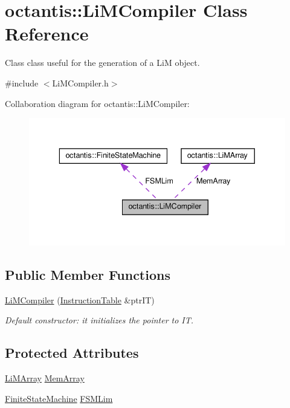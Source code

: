 \hypertarget{classoctantis_1_1LiMCompiler}{}\section{octantis\+:\+:Li\+M\+Compiler Class Reference}
\label{classoctantis_1_1LiMCompiler}


Class class useful for the generation of a LiM object.  




{\ttfamily \#include $<$Li\+M\+Compiler.\+h$>$}



Collaboration diagram for octantis\+:\+:Li\+M\+Compiler\+:
\nopagebreak
\begin{figure}[H]
\begin{center}
\leavevmode
\includegraphics[width=336pt]{classoctantis_1_1LiMCompiler__coll__graph}
\end{center}
\end{figure}
\subsection*{Public Member Functions}
\begin{DoxyCompactItemize}
\item 
\hyperlink{classoctantis_1_1LiMCompiler_a5bd2a38da7d74bfd9f990a50dc86d2e6}{Li\+M\+Compiler} (\hyperlink{classoctantis_1_1InstructionTable}{Instruction\+Table} \&ptr\+IT)
\begin{DoxyCompactList}\small\item\em Default constructor\+: it initializes the pointer to IT. \end{DoxyCompactList}\end{DoxyCompactItemize}
\subsection*{Protected Attributes}
\begin{DoxyCompactItemize}
\item 
\hyperlink{classoctantis_1_1LiMArray}{Li\+M\+Array} \hyperlink{classoctantis_1_1LiMCompiler_a11525f37ba87ad8a807407ce4b289c0d}{Mem\+Array}
\item 
\hyperlink{classoctantis_1_1FiniteStateMachine}{Finite\+State\+Machine} \hyperlink{classoctantis_1_1LiMCompiler_af1779840f74fcbf74bdd7973082ed64d}{F\+S\+M\+Lim}
\end{DoxyCompactItemize}


